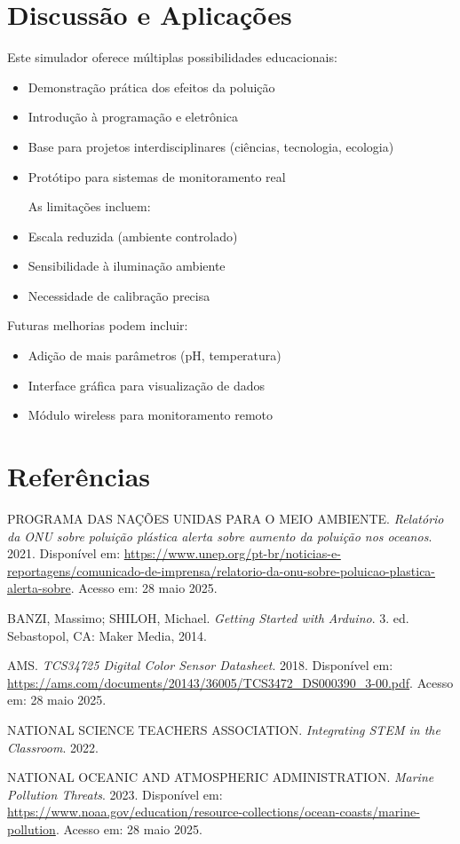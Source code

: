 \documentclass[12pt]{article}
\begin{document}
\section{Discussão e Aplicações}

Este simulador oferece múltiplas possibilidades educacionais:

\begin{itemize}
    \item Demonstração prática dos efeitos da poluição
    \item Introdução à programação e eletrônica
    \item Base para projetos interdisciplinares (ciências, tecnologia, ecologia)
    \item Protótipo para sistemas de monitoramento real
    
    As limitações incluem:
    \item Escala reduzida (ambiente controlado)
    \item Sensibilidade à iluminação ambiente
    \item Necessidade de calibração precisa
\end{itemize}

Futuras melhorias podem incluir:
\begin{itemize}
    \item Adição de mais parâmetros (pH, temperatura)
    \item Interface gráfica para visualização de dados
    \item Módulo wireless para monitoramento remoto
\end{itemize}

\section{Referências}
\begin{thebibliography}{99}

PROGRAMA DAS NAÇÕES UNIDAS PARA O MEIO AMBIENTE. \textit{Relatório da ONU sobre poluição plástica alerta sobre aumento da poluição nos oceanos}. 2021. Disponível em: \url{https://www.unep.org/pt-br/noticias-e-reportagens/comunicado-de-imprensa/relatorio-da-onu-sobre-poluicao-plastica-alerta-sobre}. Acesso em: 28 maio 2025.

BANZI, Massimo; SHILOH, Michael. \textit{Getting Started with Arduino}. 3. ed. Sebastopol, CA: Maker Media, 2014.

AMS. \textit{TCS34725 Digital Color Sensor Datasheet}. 2018. Disponível em: \url{https://ams.com/documents/20143/36005/TCS3472_DS000390_3-00.pdf}. Acesso em: 28 maio 2025.

NATIONAL SCIENCE TEACHERS ASSOCIATION. \textit{Integrating STEM in the Classroom}. 2022.

NATIONAL OCEANIC AND ATMOSPHERIC ADMINISTRATION. \textit{Marine Pollution Threats}. 2023. Disponível em: \url{https://www.noaa.gov/education/resource-collections/ocean-coasts/marine-pollution}. Acesso em: 28 maio 2025.

\end{thebibliography}
\end{document}
